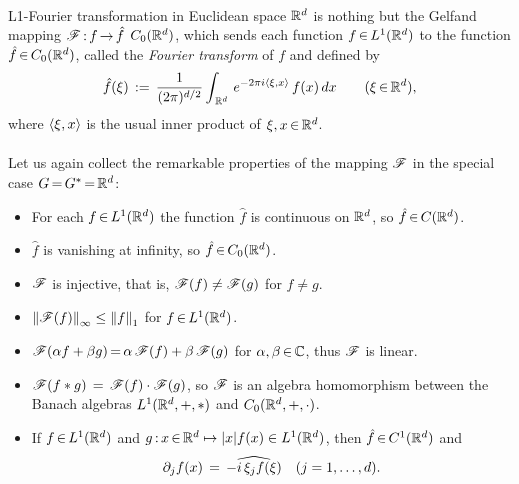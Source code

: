 \documentclass[11pt,twoside]{article}
\begin{document}
\paragraph{} %
L1-Fourier transformation in Euclidean space $\Rd$
is nothing but the Gelfand mapping
$\FT \: f \xto \hat{f}$ \xeof $C_0(\Rd)$,
which sends each function $f \xeof L^1(\Rd)$
to the function $\hat{f} \xeof C_0(\Rd)$,
called the \textit{Fourier transform} of $f$ and defined by
\begin{equation}\label{L1_FOURIER_TRANSFORM}
\hat{f}(\xi) \eqdef
\frac{1}{(2 \pi)^{d/2}}
\int_{\,\Rd} \, e^{-2 \pi i \scalar{\xi}{x}} \, f(x) \, dx
\quad \quad (\xi \xeof \Rd),
\end{equation}
where $\scalar{\xi}{x}$ is the usual inner product of $\xi,x \xeof \Rd$.

\paragraph{} %
Let us again collect the remarkable properties of the mapping $\FT$
in the special case $\topG \eq \topG^* \eq \Rd$:

\begin{itemize}[leftmargin=12pt,itemsep=5pt]
\item[1.]
For each $f \xeof L^1(\Rd)$ the function $\hat{f}$ is continuous on $\Rd$,
so $\hat{f} \xeof C(\Rd)$.

\item[2.]
$\hat{f}$ is vanishing at infinity,
so $\hat{f} \xeof C_0(\Rd)$.

\item[3.]
$\FT$ is injective,
that is,
$\FT(f) \neq \FT(g)$ for $f \neq g$.

\item[4.]
$\norm{\FT(f)}_{\infty} \leq \norm{f}_1$ for $f \xeof L^1(\Rd)$.

\item[5.]
$\FT(\alpha f + \beta g) \eq \alpha \, \FT(f) + \beta \, \FT(g)$
for $\alpha,\beta \xeof \C$,
thus $\FT$ is linear.

\item[6.]
$\FT(f \ast g) \= \FT(f) \cdot \FT(g)$,
so $\FT$ is an algebra homomorphism between the Banach algebras
$L^1(\Rd,+,\ast)$ and $C_0(\Rd,+,\cdot)$.

\item[7.]
If $f \xeof L^1(\Rd)$ and
$g \: x \xeof \Rd \mapsto \abs{x} f(x) \in L^1(\Rd)$,
then $\hat{f} \xeof C^1(\Rd)$ and
\[
\partial_j f(x) \= \widehat{-i \, \xi_j f(\xi)}
\quad (j=1,\ldots,d).
\]
\end{itemize}
\end{document}
